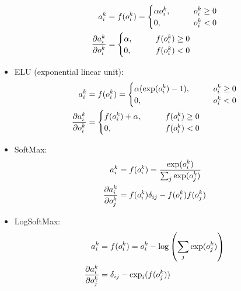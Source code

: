 \documentclass[12pt,notitlepage]{article}
\begin{document}
\begin{itemize}
\begin{align}
    \label{eq:plu-fun}
    a_{i}^{k} &= f(o_{i}^{k}) =
                \begin{cases}
                  \alpha o_{i}^{k}, \qquad & o_{i}^{k} \ge 0\\
                  0, \qquad & o_{i}^{k} < 0
                \end{cases}\\
    \frac{\partial a_{i}^{k}}{\partial o_{i}^{k}} &=
                                    \begin{cases}
                                      \alpha, \qquad & f(o_{i}^{k}) \ge 0\\
                                      0, \qquad & f(o_{i}^{k}) < 0
                                    \end{cases}
  \end{align}
\item ELU (exponential linear unit):
  \begin{align}
    \label{eq:elu-fun}
    a_{i}^{k} &= f(o_{i}^{k}) =
                \begin{cases}
                  \alpha ( \exp(o_{i}^{k}) - 1 ), \qquad & o_{i}^{k} \ge 0\\
                  0, \qquad & o_{i}^{k} < 0
                \end{cases}\\
    \frac{\partial a_{i}^{k}}{\partial o_{i}^{k}} &=
                                    \begin{cases}
                                      f(o_{i}^{k}) + \alpha, \qquad & f(o_{i}^{k}) \ge 0\\
                                      0, \qquad & f(o_{i}^{k}) < 0
                                    \end{cases}
  \end{align}
\item SoftMax:
  \begin{align}
    \label{eq:relu-fun}
    a_{i}^{k} &= f(o_{i}^{k}) = \frac{\exp(o_{i}^{k})}{\sum_{j}\exp(o_{j}^{k})}\\
    \frac{\partial a_{i}^{k}}{\partial o_{j}^{k}} &= f(o_{i}^{k})\delta_{ij} - f(o_{i}^{k})f(o_{j}^{k})
  \end{align}
\item LogSoftMax:
  \begin{align}
    \label{eq:relu-fun}
    a_{i}^{k} &= f(o_{i}^{k}) = o_{i}^{k} - \log\left(
                \sum_{j}\exp(o_{j}^{k}) \right)\\
    \frac{\partial a_{i}^{k}}{\partial o_{j}^{k}} &= \delta_{ij} - \exp_{i}(f(o_{j}^{k}))
  \end{align}
\end{itemize}
\end{document}
